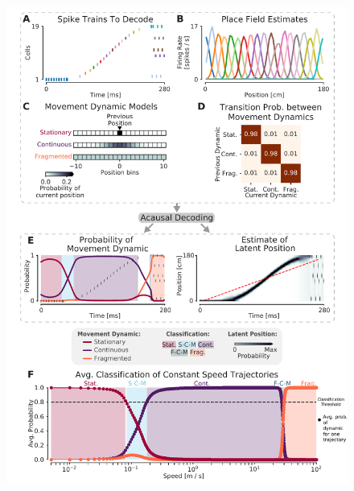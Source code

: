 \documentclass[9pt,lineno]{elife}
\providecommand{\DIFaddbeginFL}{} %
\providecommand{\DIFdelbeginFL}{} %
\providecommand{\DIFdelendFL}{} %
\newcommand{\DIFscaledelfig}{0.5}
\newlength{\DIFdelgraphicswidth} %
\newlength{\DIFdelgraphicsheight} %
\newcommand{\DIFaddincludegraphics}[2][]{{\color{blue}\fbox{\DIFOincludegraphics[#1]{#2}}}} %
\newcommand{\DIFdelincludegraphics}[2][]{%
\sbox{\DIFdelgraphicsbox}{\DIFOincludegraphics[#1]{#2}}%
\settoboxwidth{\DIFdelgraphicswidth}{\DIFdelgraphicsbox} %
\settoboxtotalheight{\DIFdelgraphicsheight}{\DIFdelgraphicsbox} %
\scalebox{\DIFscaledelfig}{%
\parbox[b]{\DIFdelgraphicswidth}{\usebox{\DIFdelgraphicsbox}\\[-\baselineskip] \rule{\DIFdelgraphicswidth}{0em}}\llap{\resizebox{\DIFdelgraphicswidth}{\DIFdelgraphicsheight}{%
\setlength{\unitlength}{\DIFdelgraphicswidth}%
\begin{picture}(1,1)%
\thicklines\linethickness{2pt} %
{\color[rgb]{1,0,0}\put(0,0){\framebox(1,1){}}}%
{\color[rgb]{1,0,0}\put(0,0){\line( 1,1){1}}}%
{\color[rgb]{1,0,0}\put(0,1){\line(1,-1){1}}}%
\end{picture}%
}\hspace*{3pt}}} %
} %
\DeclareRobustCommand{\DIFaddbeginFL}{\DIFOaddbeginFL \let\includegraphics\DIFaddincludegraphics} %
\DeclareRobustCommand{\DIFdelbeginFL}{\DIFOdelbeginFL \let\includegraphics\DIFdelincludegraphics} %
\DeclareRobustCommand{\DIFdelendFL}{\DIFOaddendFL \let\includegraphics\DIFOincludegraphics} %
\begin{document}
\begin{figure}
\DIFdelbeginFL %
\DIFdelendFL \DIFaddbeginFL \includegraphics[width=0.70\linewidth]{figures/Figure1/Figure1_final}

\end{figure}
\end{document}
